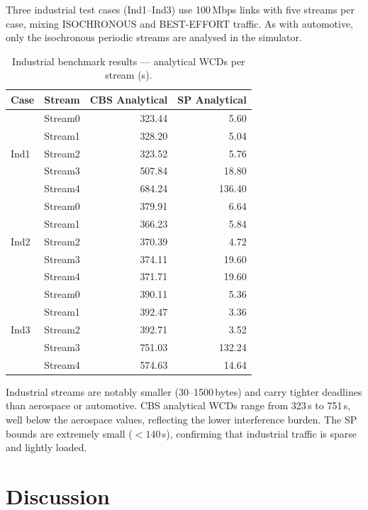 Three industrial test cases (Ind1--Ind3) use 100\,Mbps links with five streams per case, mixing ISOCHRONOUS and BEST-EFFORT traffic. As with automotive, only the isochronous periodic streams are analysed in the simulator.

\begin{table}[H]
\centering
\caption{Industrial benchmark results — analytical WCDs per stream (\textmu s).}
\label{tab:ind}
\begin{tabular}{llrr}
\toprule
Case & Stream & CBS Analytical & SP Analytical \\
\midrule
\multirow{5}{*}{Ind1}
 & Stream0 & 323.44 & 5.60   \\
 & Stream1 & 328.20 & 5.04   \\
 & Stream2 & 323.52 & 5.76   \\
 & Stream3 & 507.84 & 18.80  \\
 & Stream4 & 684.24 & 136.40 \\
\midrule
\multirow{5}{*}{Ind2}
 & Stream0 & 379.91 & 6.64  \\
 & Stream1 & 366.23 & 5.84  \\
 & Stream2 & 370.39 & 4.72  \\
 & Stream3 & 374.11 & 19.60 \\
 & Stream4 & 371.71 & 19.60 \\
\midrule
\multirow{5}{*}{Ind3}
 & Stream0 & 390.11 & 5.36   \\
 & Stream1 & 392.47 & 3.36   \\
 & Stream2 & 392.71 & 3.52   \\
 & Stream3 & 751.03 & 132.24 \\
 & Stream4 & 574.63 & 14.64  \\
\bottomrule
\end{tabular}
\end{table}

Industrial streams are notably smaller (30--1500\,bytes) and carry tighter deadlines than aerospace or automotive. CBS analytical WCDs range from 323\,\textmu s to 751\,\textmu s, well below the aerospace values, reflecting the lower interference burden. The SP bounds are extremely small ($<140$\,\textmu s), confirming that industrial traffic is sparse and lightly loaded.

\section{Discussion}
\label{sec:discussion}

